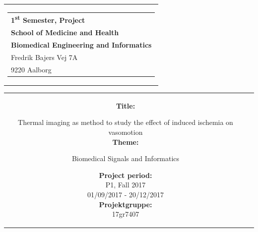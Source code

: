 % 
\thispagestyle{empty}
\begin{titlepage}
\begin{nopagebreak}
{\samepage 

\begin{tabular}{r}
\parbox{\textwidth}{  
\hfill \hspace{2cm} \parbox{8cm}{\begin{tabular}{l} %
{\small \textbf{\textcolor{aaublue}{{1\textsuperscript{st} Semester, Project}}}}\\
{\small \textbf{\textcolor{aaublue}{School of Medicine and Health}}}\\
{\small \textbf{\textcolor{aaublue}{Biomedical Engineering and Informatics}}}\\
{\small \textcolor{aaublue}{Fredrik Bajers Vej 7A}} \\
{\small \textcolor{aaublue}{9220 Aalborg}} \\
\end{tabular}}}
\end{tabular}

\begin{tabular}{cc}
\parbox{7cm}{

\textbf{Title:}

Thermal imaging as method to study the effect of induced ischemia on vasomotion \\ 

\textbf{Theme:}

\small{
 Biomedical Signals and Informatics\\
}


\parbox{8cm}{


\textbf{Project period:}\\
P1, Fall 2017\\
01/09/2017 - 20/12/2017\\
   
\textbf{Projektgruppe:}\\
17gr7407\\ %
  
}}
\end{tabular}}
\end{nopagebreak}
\end{titlepage}
